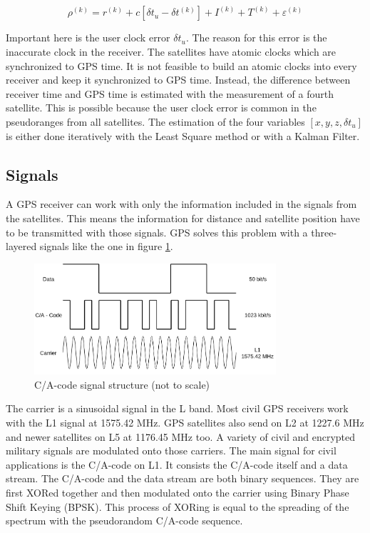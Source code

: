 \begin{equation}
 \rho^{(k)} = r^{(k)} + c[\delta t_u - \delta t^{(k)}] + I^{(k)} + T^{(k)} + \varepsilon^{(k)}		\label{eq:pseudorange}
\end{equation}

Important here is the user clock error $\delta t_u$.
The reason for this error is the inaccurate clock in the receiver.
The satellites have atomic clocks which are synchronized to GPS time.
It is not feasible to build an atomic clocks into every receiver and keep it synchronized to GPS time.
Instead, the difference between receiver time and GPS time is estimated with the measurement of a fourth satellite.
This is possible because the user clock error is common in the pseudoranges from all satellites.
The estimation of the four variables $[x, y, z, \delta t_u]$ is either done iteratively with the Least Square method or with a Kalman Filter.

\subsection{Signals}

A GPS receiver can work with only the information included in the signals from the satellites.
This means the information for distance and satellite position have to be transmitted with those signals.
GPS solves this problem with a three-layered signals like the one in figure \ref{fig:signal_structure}.

\begin{figure}[ht]
 \centering
 \includegraphics[width=0.8\textwidth]{images/Signal_Structure.png}
 \caption{C/A-code signal structure (not to scale)}
 \label{fig:signal_structure}
\end{figure}

The carrier is a sinusoidal signal in the L band.
Most civil GPS receivers work with the L1 signal at 1575.42 MHz.
GPS satellites also send on L2 at 1227.6 MHz and newer satellites on L5 at 1176.45 MHz too.
A variety of civil and encrypted military signals are modulated onto those carriers.
The main signal for civil applications is the C/A-code on L1.
It consists the C/A-code itself and a data stream.
The C/A-code and the data stream are both binary sequences.
They are first XORed together and then modulated onto the carrier using Binary Phase Shift Keying (BPSK).
This process of XORing is equal to the spreading of the spectrum with the pseudorandom C/A-code sequence.

